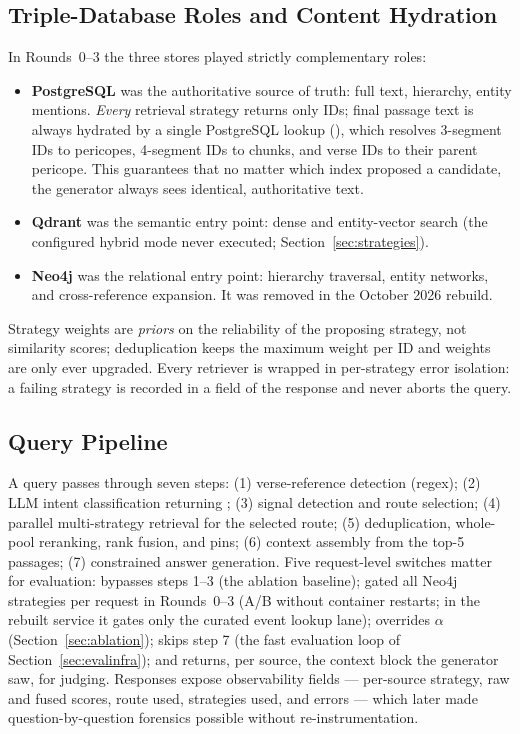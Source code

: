 \subsection{Triple-Database Roles and Content Hydration}
\label{sec:tripledb}

In Rounds~0--3 the three stores played strictly complementary roles:

\begin{itemize}
\item \textbf{PostgreSQL} was the authoritative source of truth: full
text, hierarchy, entity mentions. \emph{Every} retrieval strategy returns
only IDs; final passage text is always hydrated by a single PostgreSQL
lookup (), which resolves 3-segment IDs to
pericopes, 4-segment IDs to chunks, and verse IDs to their parent
pericope. This guarantees that no matter which index proposed a
candidate, the generator always sees identical, authoritative text.
\item \textbf{Qdrant} was the semantic entry point: dense and
entity-vector search (the configured hybrid mode never executed;
Section~\ref{sec:strategies}).
\item \textbf{Neo4j} was the relational entry point: hierarchy traversal,
entity networks, and cross-reference expansion. It was removed in the
October 2026 rebuild.
\end{itemize}

Strategy weights are \emph{priors} on the reliability of the proposing
strategy, not similarity scores; deduplication keeps the maximum weight
per ID and weights are only ever upgraded. Every retriever is wrapped in
per-strategy error isolation: a failing strategy is recorded in a
 field of the response and never aborts the query.

\subsection{Query Pipeline}
\label{sec:pipeline}

A query passes through seven steps: (1) verse-reference detection
(regex); (2) LLM intent classification returning
; (3) signal detection and route
selection; (4) parallel multi-strategy retrieval for the selected route;
(5) deduplication, whole-pool reranking, rank fusion, and pins; (6)
context assembly from the top-5 passages; (7) constrained answer
generation. Five request-level switches matter for evaluation:
 bypasses steps 1--3 (the ablation baseline);
 gated all Neo4j strategies per request in
Rounds~0--3 (A/B without container restarts; in the rebuilt service it
gates only the curated event lookup lane);  overrides $\alpha$
(Section~\ref{sec:ablation});  skips step 7 (the
fast evaluation loop of Section~\ref{sec:evalinfra}); and
 returns, per source, the context block the
generator saw, for judging. Responses expose
observability fields --- per-source strategy, raw and fused scores, route
used, strategies used, and errors --- which later made
question-by-question forensics possible without re-instrumentation.

